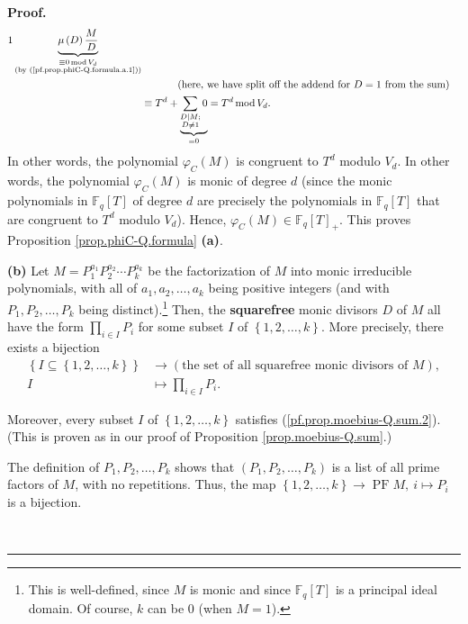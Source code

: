 \documentclass[numbers=enddot,12pt,final,onecolumn,notitlepage]{scrartcl}%
\theoremstyle{definition}
\newenvironment{proof}[1][Proof]{\noindent\textbf{#1.} }{\ \rule{0.5em}{0.5em}}
\let\sumnonlimits\sum
\let\prodnonlimits\prod
\renewcommand{\sum}{\sumnonlimits\limits}
\renewcommand{\prod}{\prodnonlimits\limits}
\begin{document}
\begin{proof}
\begin{align*}
{{1}}\underbrace{\mu\left(  D\right)  \dfrac{M}{D}}_{\substack{\equiv
0\operatorname{mod}V_{d}\\\text{(by (\ref{pf.prop.phiC-Q.formula.a.1}))}}}\\
&  \ \ \ \ \ \ \ \ \ \ \left(  \text{here, we have split off the addend for
}D=1\text{ from the sum}\right) \\
&  \equiv T^{d}+\underbrace{\sum\limits_{\substack{D\mid M;\\D\neq1}}0}%
_{=0}=T^{d}\operatorname{mod}V_{d}.
\end{align*}
In other words, the polynomial $\varphi_{C}\left(  M\right)  $ is congruent to
$T^{d}$ modulo $V_{d}$. In other words, the polynomial $\varphi_{C}\left(
M\right)  $ is monic of degree $d$ (since the monic polynomials in
$\mathbb{F}_{q}\left[  T\right]  $ of degree $d$ are precisely the polynomials
in $\mathbb{F}_{q}\left[  T\right]  $ that are congruent to $T^{d}$ modulo
$V_{d}$). Hence, $\varphi_{C}\left(  M\right)  \in\mathbb{F}_{q}\left[
T\right]  _{+}$. This proves Proposition \ref{prop.phiC-Q.formula}
\textbf{(a)}. \medskip

\textbf{(b)} Let $M=P_{1}^{a_{1}}P_{2}^{a_{2}}\cdots P_{k}^{a_{k}}$ be the
factorization of $M$ into monic irreducible polynomials, with all of
$a_{1},a_{2},\ldots,a_{k}$ being positive integers (and with $P_{1}%
,P_{2},\ldots,P_{k}$ being distinct).\footnote{This is well-defined, since $M$
is monic and since $\mathbb{F}_{q}\left[  T\right]  $ is a principal ideal
domain. Of course, $k$ can be $0$ (when $M=1$).} Then, the \textbf{squarefree}
monic divisors $D$ of $M$ all have the form $\prod_{i\in I}P_{i}$ for some
subset $I$ of $\left\{  1,2,\ldots,k\right\}  $. More precisely, there exists
a bijection%
\begin{align}
\left\{  I\subseteq\left\{  1,2,\ldots,k\right\}  \right\}   &  \rightarrow
\left(  \text{the set of all squarefree monic divisors of }M\right)
,\nonumber\\
I  &  \mapsto\prod_{i\in I}P_{i}. \label{pf.prop.phiC-Q.formula.b.bij}%
\end{align}


Moreover, every subset $I$ of $\left\{  1,2,\ldots,k\right\}  $ satisfies
(\ref{pf.prop.moebius-Q.sum.2}). (This is proven as in our proof of
Proposition \ref{prop.moebius-Q.sum}.)

The definition of $P_{1},P_{2},\ldots,P_{k}$ shows that $\left(  P_{1}%
,P_{2},\ldots,P_{k}\right)  $ is a list of all prime factors of $M$, with no
repetitions. Thus, the map $\left\{  1,2,\ldots,k\right\}  \rightarrow
\operatorname*{PF}M,\ i\mapsto P_{i}$ is a bijection.


\end{proof}
\end{document}
